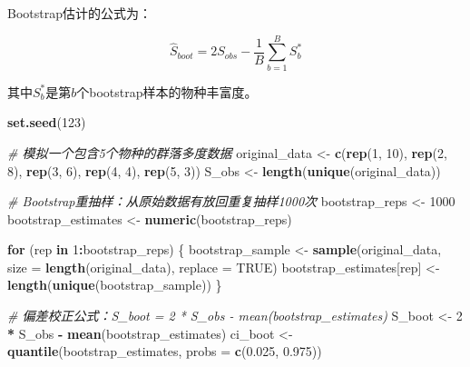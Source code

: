 \documentclass[
  twoside,12pt,fontset=none]{ctexbook}
\newenvironment{Shaded}{\begin{snugshade}}{\end{snugshade}}
\newcommand{\AttributeTok}[1]{\textcolor[rgb]{0.13,0.29,0.53}{#1}}
\newcommand{\CommentTok}[1]{\textcolor[rgb]{0.56,0.35,0.01}{\textit{#1}}}
\newcommand{\ConstantTok}[1]{\textcolor[rgb]{0.56,0.35,0.01}{#1}}
\newcommand{\ControlFlowTok}[1]{\textcolor[rgb]{0.13,0.29,0.53}{\textbf{#1}}}
\newcommand{\DecValTok}[1]{\textcolor[rgb]{0.00,0.00,0.81}{#1}}
\newcommand{\FloatTok}[1]{\textcolor[rgb]{0.00,0.00,0.81}{#1}}
\newcommand{\FunctionTok}[1]{\textcolor[rgb]{0.13,0.29,0.53}{\textbf{#1}}}
\newcommand{\NormalTok}[1]{#1}
\newcommand{\OtherTok}[1]{\textcolor[rgb]{0.56,0.35,0.01}{#1}}
\newcommand{\SpecialCharTok}[1]{\textcolor[rgb]{0.81,0.36,0.00}{\textbf{#1}}}
\begin{document}
Bootstrap估计的公式为：

\[\hat{S}_{boot} = 2S_{obs} - \frac{1}{B}\sum_{b=1}^B S_b^*\]

其中\(S_b^*\)是第\(b\)个bootstrap样本的物种丰富度。

\begin{Shaded}
\begin{Highlighting}[]
\FunctionTok{set.seed}\NormalTok{(}\DecValTok{123}\NormalTok{)}

\CommentTok{\# 模拟一个包含5个物种的群落多度数据}
\NormalTok{original\_data }\OtherTok{\textless{}{-}} \FunctionTok{c}\NormalTok{(}\FunctionTok{rep}\NormalTok{(}\DecValTok{1}\NormalTok{, }\DecValTok{10}\NormalTok{), }\FunctionTok{rep}\NormalTok{(}\DecValTok{2}\NormalTok{, }\DecValTok{8}\NormalTok{), }\FunctionTok{rep}\NormalTok{(}\DecValTok{3}\NormalTok{, }\DecValTok{6}\NormalTok{), }\FunctionTok{rep}\NormalTok{(}\DecValTok{4}\NormalTok{, }\DecValTok{4}\NormalTok{), }\FunctionTok{rep}\NormalTok{(}\DecValTok{5}\NormalTok{, }\DecValTok{3}\NormalTok{))}
\NormalTok{S\_obs }\OtherTok{\textless{}{-}} \FunctionTok{length}\NormalTok{(}\FunctionTok{unique}\NormalTok{(original\_data))}

\CommentTok{\# Bootstrap重抽样：从原始数据有放回重复抽样1000次}
\NormalTok{bootstrap\_reps }\OtherTok{\textless{}{-}} \DecValTok{1000}
\NormalTok{bootstrap\_estimates }\OtherTok{\textless{}{-}} \FunctionTok{numeric}\NormalTok{(bootstrap\_reps)}

\ControlFlowTok{for}\NormalTok{ (rep }\ControlFlowTok{in} \DecValTok{1}\SpecialCharTok{:}\NormalTok{bootstrap\_reps) \{}
\NormalTok{  bootstrap\_sample }\OtherTok{\textless{}{-}} \FunctionTok{sample}\NormalTok{(original\_data, }\AttributeTok{size =} \FunctionTok{length}\NormalTok{(original\_data),}
                           \AttributeTok{replace =} \ConstantTok{TRUE}\NormalTok{)}
\NormalTok{  bootstrap\_estimates[rep] }\OtherTok{\textless{}{-}} \FunctionTok{length}\NormalTok{(}\FunctionTok{unique}\NormalTok{(bootstrap\_sample))}
\NormalTok{\}}

\CommentTok{\# 偏差校正公式：S\_boot = 2 * S\_obs {-} mean(bootstrap\_estimates)}
\NormalTok{S\_boot }\OtherTok{\textless{}{-}} \DecValTok{2} \SpecialCharTok{*}\NormalTok{ S\_obs }\SpecialCharTok{{-}} \FunctionTok{mean}\NormalTok{(bootstrap\_estimates)}
\NormalTok{ci\_boot }\OtherTok{\textless{}{-}} \FunctionTok{quantile}\NormalTok{(bootstrap\_estimates, }\AttributeTok{probs =} \FunctionTok{c}\NormalTok{(}\FloatTok{0.025}\NormalTok{, }\FloatTok{0.975}\NormalTok{))}


\end{Highlighting}
\end{Shaded}
\end{document}
